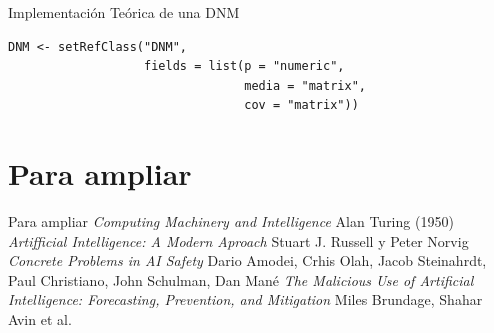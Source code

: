 \documentclass[xcolor=table]{beamer}
\begin{document}
\begin{frame}{Implementación Teórica de una DNM}

\begin{lstlisting}
DNM <- setRefClass("DNM", 
                   fields = list(p = "numeric", 
                                 media = "matrix", 
                                 cov = "matrix"))
\end{lstlisting}
\end{frame}

\section{Para ampliar}
\begin{frame}{Para ampliar}
\textit{Computing Machinery and Intelligence} Alan Turing (1950)
\newline
\newline
\textit{Artifficial Intelligence: A Modern Aproach} Stuart J. Russell y Peter Norvig
\newline
\newline
\textit{Concrete Problems in AI Safety} Dario Amodei, Crhis Olah, Jacob Steinahrdt, Paul Christiano, John Schulman, Dan Mané
\newline
\newline
\textit{The Malicious Use of Artificial Intelligence: Forecasting, Prevention, and Mitigation} Miles Brundage, Shahar Avin et al.
\end{frame}
\end{document}
